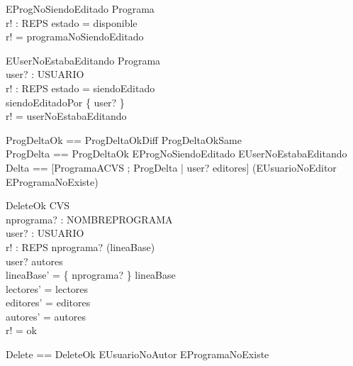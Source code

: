 \documentclass[11pt]{article}
\begin{document}
  \begin{schema}{EProgNoSiendoEditado}
  \Xi Programa \\
  r! : REPS
  \where
  estado = disponible \\
  r! = programaNoSiendoEditado
  \end{schema}
  
  \begin{schema}{EUserNoEstabaEditando}
  \Xi Programa \\
  user? : USUARIO \\
  r! : REPS
  \where
  estado = siendoEditado \\
  siendoEditadoPor \neq \{ user? \} \\
  r! = userNoEstabaEditando
  \end{schema}
  
  \begin{zed}
  ProgDeltaOk == ProgDeltaOkDiff \lor ProgDeltaOkSame \\
  ProgDelta == ProgDeltaOk \lor EProgNoSiendoEditado \lor EUserNoEstabaEditando \\
  Delta == [ProgramaACVS ; ProgDelta | user? \in editores] \lor (EUsuarioNoEditor \lor EProgramaNoExiste)
  \end{zed}
  
  \begin{schema}{DeleteOk}
  \Delta CVS \\
  nprograma? : NOMBREPROGRAMA \\
  user? : USUARIO \\
  r! : REPS
  \where
  nprograma? \in (\dom lineaBase) \\
  user? \in autores \\
  lineaBase' =  \{ nprograma? \} \ndres lineaBase  \\
  lectores' = lectores \\
  editores' = editores \\
  autores' = autores \\
  r! = ok
  \end{schema}
  
  \begin{zed}
  Delete == DeleteOk \lor EUsuarioNoAutor \lor EProgramaNoExiste
  \end{zed}
\end{document}
